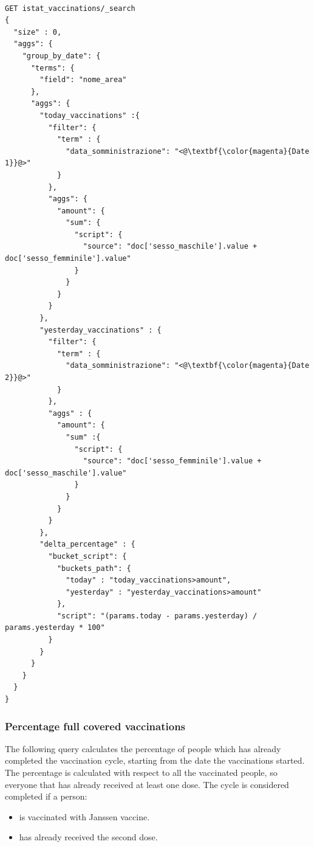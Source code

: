 \documentclass{article}
\begin{document}
\begin{lstlisting}[language=cypher, label=lst:cypher-example]

GET istat_vaccinations/_search
{
  "size" : 0,
  "aggs": {
    "group_by_date": {
      "terms": {
        "field": "nome_area"
      },
      "aggs": {
        "today_vaccinations" :{
          "filter": {
            "term" : {
              "data_somministrazione": "<@\textbf{\color{magenta}{Date 1}}@>"
            }
          },
          "aggs": {
            "amount": {
              "sum": {
                "script": {
                  "source": "doc['sesso_maschile'].value + doc['sesso_femminile'].value"
                }
              }
            }
          }
        },
        "yesterday_vaccinations" : {
          "filter": {
            "term" : {
              "data_somministrazione": "<@\textbf{\color{magenta}{Date 2}}@>"
            }
          },
          "aggs" : {
            "amount": {
              "sum" :{
                "script": {
                  "source": "doc['sesso_femminile'].value + doc['sesso_maschile'].value"
                }
              }
            }
          }
        },
        "delta_percentage" : {
          "bucket_script": {
            "buckets_path": {
              "today" : "today_vaccinations>amount",
              "yesterday" : "yesterday_vaccinations>amount"
            },
            "script": "(params.today - params.yesterday) / params.yesterday * 100"
          }
        }
      }
    }
  }
}

\end{lstlisting}
\newpage
\subsubsection{Percentage full covered vaccinations}
The following query calculates the percentage of people which has already completed the vaccination cycle, starting from the date the vaccinations started. The percentage is calculated with respect to all the vaccinated people, so everyone that has already received at least one dose.
The cycle is considered completed if a person:
\begin{itemize}
\item is vaccinated with Janssen vaccine.
\item has already received the second dose.
\end{itemize}
\end{document}

